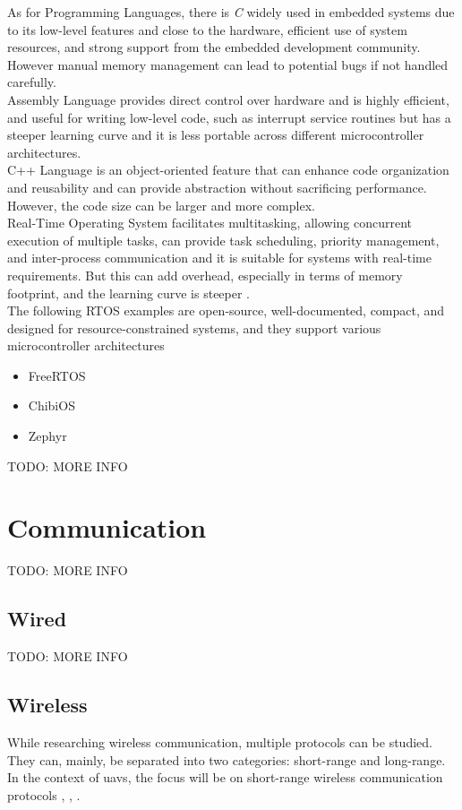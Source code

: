 As for Programming Languages, there is \textit{C} widely used in embedded systems due to its low-level features and close to the hardware, efficient use of system resources, and strong support from the embedded development community.
However manual memory management can lead to potential bugs if not handled carefully.\\
Assembly Language provides direct control over hardware and is highly efficient, and useful for writing low-level code, such as interrupt service routines but has a steeper learning curve and it is less portable across different microcontroller architectures.\\
C++ Language is an object-oriented feature that can enhance code organization and reusability and can provide abstraction without sacrificing performance.
However, the code size can be larger and more complex.\\

Real-Time Operating System facilitates multitasking, allowing concurrent execution of multiple tasks, can provide task scheduling, priority management, and inter-process communication and it is suitable for systems with real-time requirements.
But this can add overhead, especially in terms of memory footprint, and the learning curve is steeper \cite{RTOS1}.\\
The following \gls{RTOS} examples are open-source, well-documented, compact, and designed for resource-constrained systems, and they support various microcontroller architectures
\begin{itemize}
    \item FreeRTOS
    \item ChibiOS
    \item Zephyr
\end{itemize}

TODO: MORE INFO

\section{Communication}
TODO: MORE INFO
\subsection{Wired}
TODO: MORE INFO

\subsection{Wireless}
While researching wireless communication, multiple protocols can be studied. They can, mainly, be separated into two categories: short-range and long-range.
In the context of \glspl{uav}, the focus will be on short-range wireless communication protocols \cite{WCOM1}, \cite{WCOM6}, \cite{WCOM7}.


